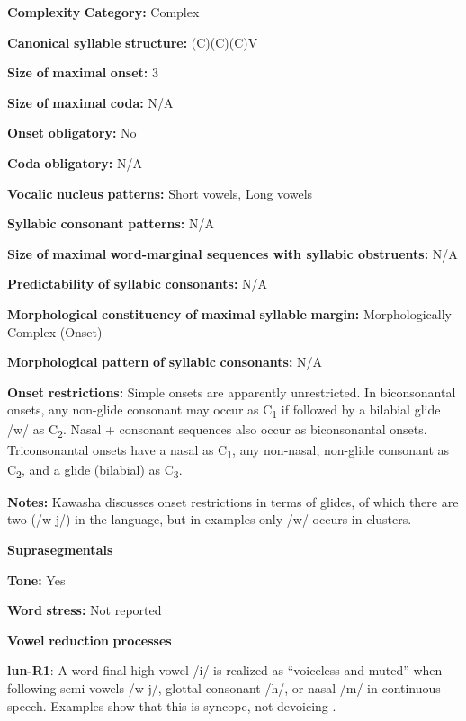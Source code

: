 \textbf{Complexity} \textbf{Category:} Complex

\textbf{Canonical} \textbf{syllable} \textbf{structure:} (C)(C)(C)V \citep[20-21]{Kawasha2003}

\textbf{Size} \textbf{of} \textbf{maximal} \textbf{onset:} 3

\textbf{Size} \textbf{of} \textbf{maximal} \textbf{coda:} N/A

\textbf{Onset} \textbf{obligatory:} No

\textbf{Coda} \textbf{obligatory:} N/A

\textbf{Vocalic} \textbf{nucleus} \textbf{patterns:} Short vowels, Long vowels

\textbf{Syllabic} \textbf{consonant} \textbf{patterns:} N/A

\textbf{Size} \textbf{of} \textbf{maximal} \textbf{word{}-marginal sequences with syllabic obstruents:} N/A

\textbf{Predictability} \textbf{of} \textbf{syllabic} \textbf{consonants:} N/A

\textbf{Morphological} \textbf{constituency} \textbf{of} \textbf{maximal} \textbf{syllable} \textbf{margin:} Morphologically Complex (Onset)

\textbf{Morphological} \textbf{pattern} \textbf{of} \textbf{syllabic} \textbf{consonants:} N/A

\textbf{Onset} \textbf{restrictions:} Simple onsets are apparently unrestricted. In biconsonantal onsets, any non-glide consonant may occur as C\textsubscript{1} if followed by a bilabial glide /w/ as C\textsubscript{2}. Nasal + consonant sequences also occur as biconsonantal onsets. Triconsonantal onsets have a nasal as C\textsubscript{1}, any non-nasal, non-glide consonant as C\textsubscript{2}, and a glide (bilabial) as C\textsubscript{3}.

\textbf{Notes:} Kawasha discusses onset restrictions in terms of glides, of which there are two (/w j/) in the language, but in examples only /w/ occurs in clusters.

\textbf{Suprasegmentals}

\textbf{Tone:} Yes

\textbf{Word} \textbf{stress:} Not reported

\textbf{Vowel} \textbf{reduction} \textbf{processes}

\textbf{lun-R1}: A word-final high vowel /i/ is realized as “voiceless and muted” when following semi-vowels /w j/, glottal consonant /h/, or nasal /m/ in continuous speech. Examples show that this is syncope, not devoicing \citep[37-8]{Kawasha2003}.

